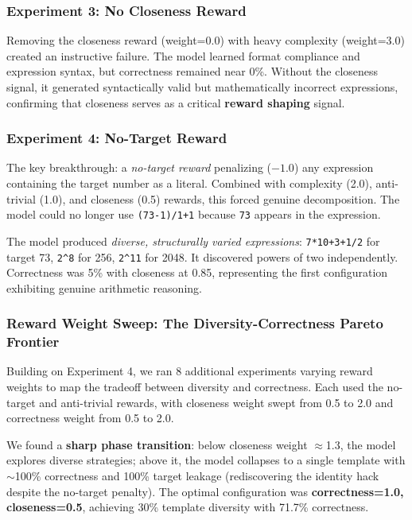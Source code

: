 \documentclass[11pt, letterpaper]{article}
\begin{document}
\subsubsection{Experiment 3: No Closeness Reward}

Removing the closeness reward (weight=0.0) with heavy complexity (weight=3.0) created an instructive failure. The model learned format compliance and expression syntax, but correctness remained near 0\%. Without the closeness signal, it generated syntactically valid but mathematically incorrect expressions, confirming that closeness serves as a critical \textbf{reward shaping} signal.

\subsubsection{Experiment 4: No-Target Reward}

The key breakthrough: a \emph{no-target reward} penalizing ($-1.0$) any expression containing the target number as a literal. Combined with complexity (2.0), anti-trivial (1.0), and closeness (0.5) rewards, this forced genuine decomposition. The model could no longer use \texttt{(73-1)/1+1} because \texttt{73} appears in the expression.

The model produced \emph{diverse, structurally varied expressions}: \texttt{7*10+3+1/2} for target 73, \texttt{2\^{}8} for 256, \texttt{2\^{}11} for 2048. It discovered powers of two independently. Correctness was 5\% with closeness at 0.85, representing the first configuration exhibiting genuine arithmetic reasoning.

\subsubsection{Reward Weight Sweep: The Diversity-Correctness Pareto Frontier}

Building on Experiment 4, we ran 8 additional experiments varying reward weights to map the tradeoff between diversity and correctness. Each used the no-target and anti-trivial rewards, with closeness weight swept from 0.5 to 2.0 and correctness weight from 0.5 to 2.0.

We found a \textbf{sharp phase transition}: below closeness weight $\approx$1.3, the model explores diverse strategies; above it, the model collapses to a single template with $\sim$100\% correctness and 100\% target leakage (rediscovering the identity hack despite the no-target penalty). The optimal configuration was \textbf{correctness=1.0, closeness=0.5}, achieving 30\% template diversity with 71.7\% correctness.
\end{document}
